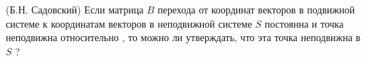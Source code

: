 (Б.Н. Садовский)
Если матрица $B$ перехода от координат векторов в подвижной системе 
к координатам векторов в неподвижной системе $S$ постоянна и точка 
неподвижна относительно  , то можно ли утверждать, что эта точка 
неподвижна в $S$ ?
